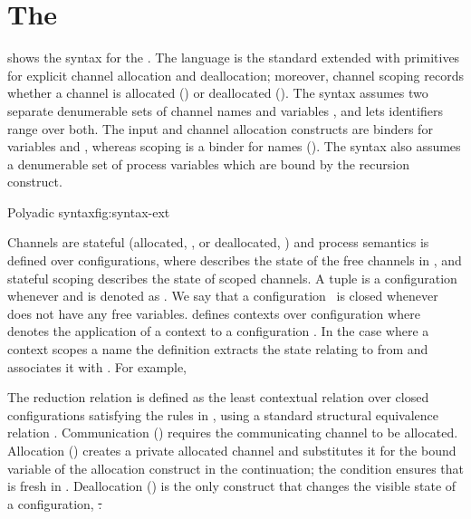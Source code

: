 \documentclass[copyright]{eptcs}
\begin{document}
\section{The \picR}

 shows the syntax for the \picr. The language is the
standard \pic extended with primitives for explicit channel allocation and
deallocation; moreover, channel scoping records whether a channel is allocated
() or deallocated ().  The syntax assumes two separate denumerable
sets of channel names  and variables , and lets
identifiers  range over both.  The input and channel
allocation constructs are binders for variables  and  \resp,
whereas scoping is a binder for names (\ie ).  The syntax also assumes a
denumerable set of process variables  which are bound by the
recursion construct. 

\begin{display}{Polyadic \picr syntax}{fig:syntax-ext}

\end{display}

Channels are stateful (allocated, \salloc, or deallocated, \sdalloc) and
process semantics is defined over configurations,  where
 describes the state of
the free channels in , and stateful scoping  describes the
state of scoped channels.  A tuple  is a configuration
whenever  and is denoted  as \confSP. We say that a
configuration \confSP\ is closed whenever  does not have any free variables.
 defines contexts over configuration where
 denotes the application of a context  to a
configuration \confSP.  In the case where a context scopes a name  the
definition extracts the state relating to  from \st{} and associates it with
. For example,


The reduction relation is defined as the least contextual relation over closed
configurations satisfying the rules in , using a
standard \pic structural equivalence relation .  Communication
() requires the communicating channel to be allocated. Allocation
() creates a private allocated channel and substitutes it for the
bound variable of the allocation construct in the continuation; the condition
 ensures that  is fresh in . Deallocation ()
is the only construct that changes the visible state of a configuration, \st. 
\end{document}
